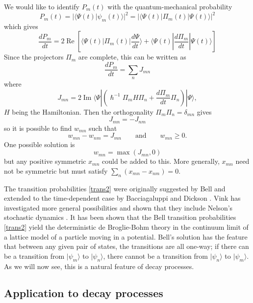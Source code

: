 \documentclass[12pt,a4paper,reqno]{article}
\renewcommand{\(}{\left(}
\renewcommand{\)}{\right)}
\renewcommand{\hbar}{\hslash}
\newcommand{\<}{\langle}
\renewcommand{\>}{\rangle}
\renewcommand{\Re}{\operatorname{Re}}
\renewcommand{\Im}{\operatorname{Im}}
\theoremstyle{plain} %
\theoremstyle{definition}
\theoremstyle{remark}
\begin{document}
We would like to identify $P_m(t)$ with the quantum-mechanical probability
\begin{equation}\label{qmprob}
P_m(t) = |\<\Psi(t)|\psi_m(t)\>|^2
= \left|\<\Psi(t)|\Pi_m(t)|\Psi(t)\>\right|^2
\end{equation}
which gives
\[
\frac{dP_m}{dt} = 2\Re \left[\<\Psi(t)|\Pi_m(t)|\frac{d\Psi}{dt}\> +
\<\Psi(t)|\frac{d\Pi_m}{dt}|\Psi(t)\>\right]
\]
Since the projectors $\Pi_m$ are complete, this can be written as 
\[
\frac{dP_m}{dt} = \sum_n J_{mn}
\]
where
\begin{equation}\label{trans1}
J_{mn} = 2\Im \<\Psi|\(\hbar^{-1}\Pi_mH\Pi_n +
\frac{d\Pi_m}{dt}\Pi_n\)|\Psi\>,
\end{equation}
$H$ being the Hamiltonian. Then the orthogonality $\Pi_m\Pi_n = \delta_{mn}$ gives
\[
J_{mn} = -J_{nm}
\]
so it is possible to find $w_{mn}$ such that 
\[
w_{mn} - w_{nm} = J_{mn} \qquad \text{and} \qquad w_{mn} \ge 0.
\]
One possible solution is
\begin{equation}\label{trans2}
w_{mn} = \max (J_{mn}, 0)
\end{equation}
but any positive symmetric $x_{mn}$ could be added to this. More
generally, $x_{mn}$ need not be symmetric but must satisfy
$\sum_n(x_{mn} - x_{nm}) = 0$.

The transition probabilities \eqref{trans2} were originally suggested by
Bell \cite{Bell:beables} and extended to
the time-dependent case by Bacciagaluppi and Dickson
\cite{BacciaDickson}. Vink \cite{Vink}
has investigated more general possibilities and shown that they include
Nelson's stochastic dynamics \cite{Nelson:book}. It has been shown 
\cite{determlimit} that the Bell transition probabilities \eqref{trans2}
yield the deterministic de Broglie-Bohm theory in the continuum limit of
a lattice model of a particle moving in a potential. Bell's solution has
the feature that between any given pair of states, the transitions are
all one-way; if there can be a transition from $|\psi_m\>$ to
$|\psi_n\>$, there cannot be a transition from $|\psi_n\>$ to
$|\psi_m\>$. As we will now see, this is a natural feature of decay
processes.


\subsection{Application to decay processes}
\end{document}
